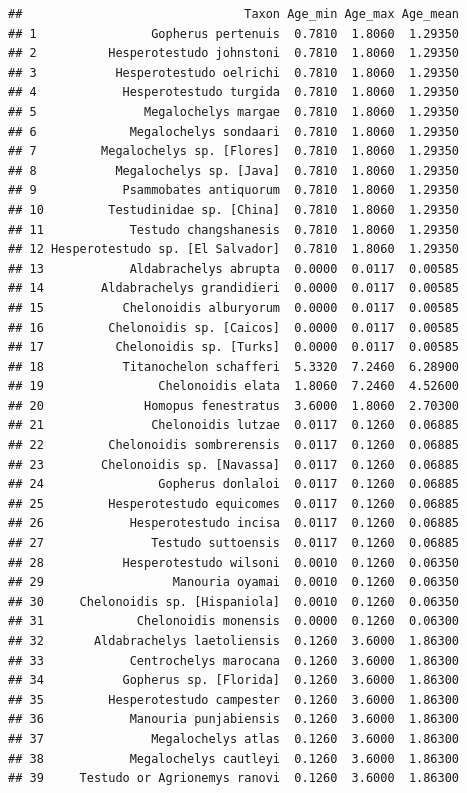 \documentclass[]{article}
\begin{document}
\begin{verbatim}
##                               Taxon Age_min Age_max Age_mean
## 1                Gopherus pertenuis  0.7810  1.8060  1.29350
## 2          Hesperotestudo johnstoni  0.7810  1.8060  1.29350
## 3           Hesperotestudo oelrichi  0.7810  1.8060  1.29350
## 4            Hesperotestudo turgida  0.7810  1.8060  1.29350
## 5               Megalochelys margae  0.7810  1.8060  1.29350
## 6             Megalochelys sondaari  0.7810  1.8060  1.29350
## 7         Megalochelys sp. [Flores]  0.7810  1.8060  1.29350
## 8           Megalochelys sp. [Java]  0.7810  1.8060  1.29350
## 9            Psammobates antiquorum  0.7810  1.8060  1.29350
## 10         Testudinidae sp. [China]  0.7810  1.8060  1.29350
## 11            Testudo changshanesis  0.7810  1.8060  1.29350
## 12 Hesperotestudo sp. [El Salvador]  0.7810  1.8060  1.29350
## 13            Aldabrachelys abrupta  0.0000  0.0117  0.00585
## 14        Aldabrachelys grandidieri  0.0000  0.0117  0.00585
## 15           Chelonoidis alburyorum  0.0000  0.0117  0.00585
## 16         Chelonoidis sp. [Caicos]  0.0000  0.0117  0.00585
## 17          Chelonoidis sp. [Turks]  0.0000  0.0117  0.00585
## 18           Titanochelon schafferi  5.3320  7.2460  6.28900
## 19                Chelonoidis elata  1.8060  7.2460  4.52600
## 20              Homopus fenestratus  3.6000  1.8060  2.70300
## 21               Chelonoidis lutzae  0.0117  0.1260  0.06885
## 22         Chelonoidis sombrerensis  0.0117  0.1260  0.06885
## 23        Chelonoidis sp. [Navassa]  0.0117  0.1260  0.06885
## 24                Gopherus donlaloi  0.0117  0.1260  0.06885
## 25         Hesperotestudo equicomes  0.0117  0.1260  0.06885
## 26            Hesperotestudo incisa  0.0117  0.1260  0.06885
## 27               Testudo suttoensis  0.0117  0.1260  0.06885
## 28           Hesperotestudo wilsoni  0.0010  0.1260  0.06350
## 29                  Manouria oyamai  0.0010  0.1260  0.06350
## 30     Chelonoidis sp. [Hispaniola]  0.0010  0.1260  0.06350
## 31             Chelonoidis monensis  0.0000  0.1260  0.06300
## 32       Aldabrachelys laetoliensis  0.1260  3.6000  1.86300
## 33            Centrochelys marocana  0.1260  3.6000  1.86300
## 34           Gopherus sp. [Florida]  0.1260  3.6000  1.86300
## 35         Hesperotestudo campester  0.1260  3.6000  1.86300
## 36            Manouria punjabiensis  0.1260  3.6000  1.86300
## 37               Megalochelys atlas  0.1260  3.6000  1.86300
## 38            Megalochelys cautleyi  0.1260  3.6000  1.86300
## 39     Testudo or Agrionemys ranovi  0.1260  3.6000  1.86300

\end{verbatim}
\end{document}
